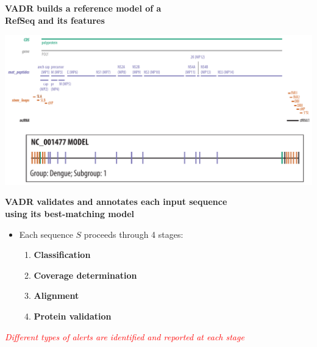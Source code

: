 \documentclass[landscape]{slides}
\begin{document}
\begin{slide}
\begin{center}
\large{\textbf{VADR builds a reference model of a \\ RefSeq and its features}}
\end{center}

\includegraphics[width=10.5in]{figs/dengue-features}

\vfill
\end{slide}
\begin{slide}
\begin{center}
\large{\textbf{VADR validates and annotates each input sequence \\ using its 
  best-matching model}}

\begin{itemize}
\item Each sequence $S$ proceeds through 4 stages:
\begin{enumerate}
\item \textbf{Classification}
\item \textbf{Coverage determination}
\item \textbf{Alignment}
\item \textbf{Protein validation}
\end{enumerate}
\end{itemize}

\normalsize
\textcolor{red}{\emph{Different types of alerts are identified and reported at each stage}}

\end{center}

\vfill
\end{slide}
\end{document}

